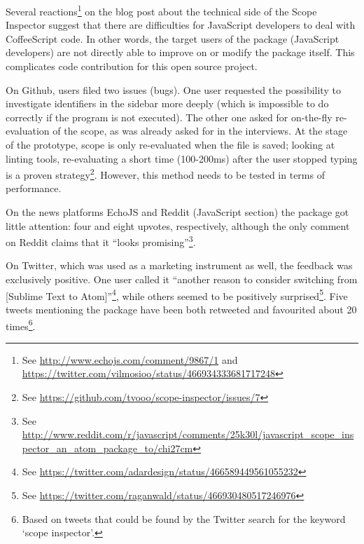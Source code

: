 Several
reactions\footnote{See \url{http://www.echojs.com/comment/9867/1} and\\\url{https://twitter.com/vilmosioo/status/466934333681717248}}
on the blog post about the technical side of the Scope Inspector
\cite{tvo} suggest that there are difficulties for JavaScript developers
to deal with CoffeeScript code. In other words, the target users of the
package (JavaScript developers) are not directly able to improve on or
modify the package itself. This complicates code contribution for this
open source project.

On Github, users filed two issues (bugs). One user requested the
possibility to investigate identifiers in the sidebar more deeply (which
is impossible to do correctly if the program is not executed). The other
one asked for on-the-fly re-evaluation of the scope, as was already
asked for in the interviews. At the stage of the prototype, scope is
only re-evaluated when the file is saved; looking at linting tools,
re-evaluating a short time (100-200ms) after the user stopped typing is
a proven
strategy\footnote{See \url{https://github.com/tvooo/scope-inspector/issues/7}}.
However, this method needs to be tested in terms of performance.

On the news platforms EchoJS and Reddit (JavaScript section) the package
got little attention: four and eight upvotes, respectively, although the
only comment on Reddit claims that it “looks
promising”\footnote{See \url{http://www.reddit.com/r/javascript/comments/25k30l/javascript_scope_inspector_an_atom_package_to/chi27cm}}.

On Twitter, which was used as a marketing instrument as well, the
feedback was exclusively positive. One user called it “another reason to
consider switching from {[}Sublime Text to
Atom{]}”\footnote{See \url{https://twitter.com/adardesign/status/466589449561055232}},
while others seemed to be positively
surprised\footnote{See \url{https://twitter.com/raganwald/status/466930480517246976}}.
Five tweets mentioning the package have been both retweeted and
favourited about 20
times\footnote{Based on tweets that could be found by the Twitter search for the keyword `scope inspector'.}.
